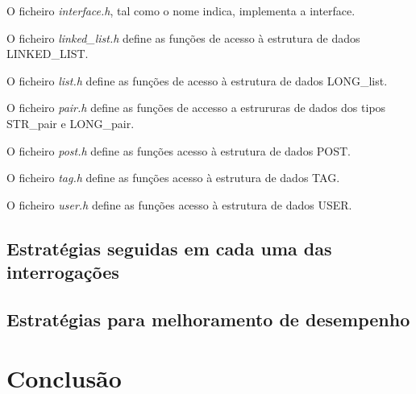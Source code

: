 \documentclass[10pt]{report}
\begin{document}
O ficheiro \textit{interface.h}, tal como o nome indica, implementa a interface.

O ficheiro \textit{linked\_list.h} define as funções de acesso à estrutura de dados LINKED\_LIST.

O ficheiro \textit{list.h} define as funções de acesso à estrutura de dados LONG\_list.

O ficheiro \textit{pair.h} define as funções de accesso a estrururas de dados dos tipos STR\_pair e LONG\_pair.

O ficheiro \textit{post.h} define as funções acesso à estrutura de dados POST.

O ficheiro \textit{tag.h} define as funções acesso à estrutura de dados TAG.

O ficheiro \textit{user.h} define as funções acesso à estrutura de dados USER.

\section{Estratégias seguidas em cada uma das interrogações}

\section{Estratégias para melhoramento de desempenho}

\chapter{Conclusão}
\label{sec:conclusao}
\end{document}
